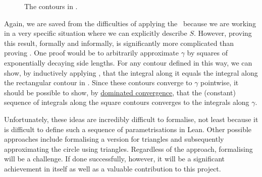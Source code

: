 \begin{wrapfigure}{r}{0.4\linewidth}
    \vspace{-0.7em}
    \centering
    \caption{The contours in .}
    \label{Ch5:Fig:Square_Circle_Contour}
\end{wrapfigure}

Again, we are saved from the difficulties of applying the \JCT\ because we are working in a very specific situation where we can explicitly describe $S$. However, proving this result, formally and informally, is significantly more complicated than proving . One proof would be to arbitrarily approximate $\gamma$ by squares of exponentially decaying side lengths. For any contour defined in this way, we can show, by inductively applying , that the integral along it equals the integral along the rectangular contour in . Since these contours converge to $\gamma$ pointwise, it should be possible to show, by \href{https://github.com/leanprover-community/mathlib4/blob/c38c7fde32656c7fa1b2471ed1ae0d50a600f089/Mathlib/MeasureTheory/Integral/DominatedConvergence.lean#L49-L63}{dominated convergence}, that the (constant) sequence of integrals along the square contours converges to the integrals along $\gamma$.

Unfortunately, these ideas are incredibly difficult to formalise, not least because it is difficult to define such a sequence of parametrisations in Lean. Other possible approaches include formalising a version for triangles and subsequently approximating the circle using triangles. Regardless of the approach, formalising  will be a challenge. If done successfully, however, it will be a significant achievement in itself as well as a valuable contribution to this project.